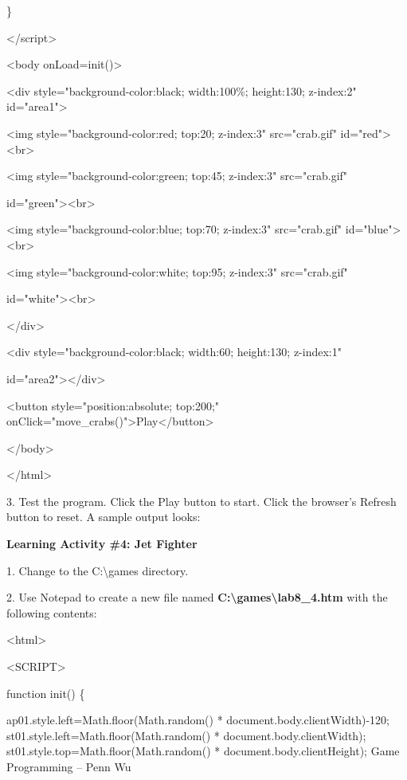 \documentclass[
]{article}
\begin{document}
\}

\textless/script\textgreater{}

\textless body onLoad=init()\textgreater{}

\textless div style="background-color:black; width:100\%; height:130;
z-index:2" id="area1"\textgreater{}

\textless img style="background-color:red; top:20; z-index:3"
src="crab.gif" id="red"\textgreater\textless br\textgreater{}

\textless img style="background-color:green; top:45; z-index:3"
src="crab.gif"

id="green"\textgreater\textless br\textgreater{}

\textless img style="background-color:blue; top:70; z-index:3"
src="crab.gif" id="blue"\textgreater\textless br\textgreater{}

\textless img style="background-color:white; top:95; z-index:3"
src="crab.gif"

id="white"\textgreater\textless br\textgreater{}

\textless/div\textgreater{}

\textless div style="background-color:black; width:60; height:130;
z-index:1"

id="area2"\textgreater\textless/div\textgreater{}

\textless button style="position:absolute; top:200;"
onClick="move\_crabs()"\textgreater Play\textless/button\textgreater{}

\textless/body\textgreater{}

\textless/html\textgreater{}

3. Test the program. Click the Play button to start. Click the browser's
Refresh button to reset. A sample output looks:

\textbf{Learning Activity \#4: Jet Fighter}

1. Change to the C:\textbackslash games directory.

2. Use Notepad to create a new file named
\textbf{C:\textbackslash games\textbackslash lab8\_4.htm} with the
following contents:

\textless html\textgreater{}

\textless SCRIPT\textgreater{}

function init() \{

ap01.style.left=Math.floor(Math.random() *
document.body.clientWidth)-120; st01.style.left=Math.floor(Math.random()
* document.body.clientWidth); st01.style.top=Math.floor(Math.random() *
document.body.clientHeight); Game Programming -- Penn Wu
\end{document}

